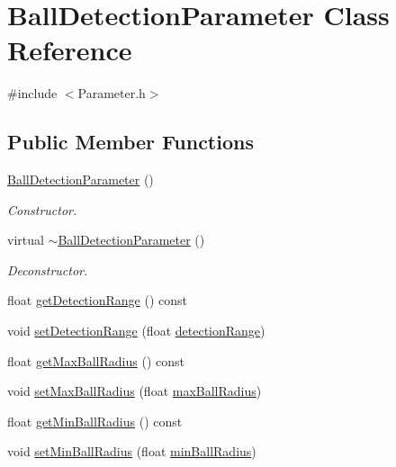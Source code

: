 \hypertarget{classBallDetectionParameter}{\section{\-Ball\-Detection\-Parameter \-Class \-Reference}
\label{classBallDetectionParameter}
}


{\ttfamily \#include $<$\-Parameter.\-h$>$}

\subsection*{\-Public \-Member \-Functions}
\begin{DoxyCompactItemize}
\item 
\hypertarget{classBallDetectionParameter_aacbacfe77b57c5472ff94983866213d8}{\hyperlink{classBallDetectionParameter_aacbacfe77b57c5472ff94983866213d8}{\-Ball\-Detection\-Parameter} ()}\label{classBallDetectionParameter_aacbacfe77b57c5472ff94983866213d8}

\begin{DoxyCompactList}\small\item\em \-Constructor. \end{DoxyCompactList}\item 
\hypertarget{classBallDetectionParameter_a451b9461f938a5446237381e5809bfb6}{virtual \hyperlink{classBallDetectionParameter_a451b9461f938a5446237381e5809bfb6}{$\sim$\-Ball\-Detection\-Parameter} ()}\label{classBallDetectionParameter_a451b9461f938a5446237381e5809bfb6}

\begin{DoxyCompactList}\small\item\em \-Deconstructor. \end{DoxyCompactList}\item 
float \hyperlink{classBallDetectionParameter_ae5fb7a62883509b5a08b5e4b317ab230}{get\-Detection\-Range} () const 
\item 
void \hyperlink{classBallDetectionParameter_a0973c5ea93d8fb3d0ab5013dd9111d6f}{set\-Detection\-Range} (float \hyperlink{classBallDetectionParameter_aca08f6d290a7fcda5359f126cf2e3065}{detection\-Range})
\item 
float \hyperlink{classBallDetectionParameter_a7b8db2d13e3e4c0aec85923e6a1812e2}{get\-Max\-Ball\-Radius} () const 
\item 
void \hyperlink{classBallDetectionParameter_ac710c9a6f55d4ccf347bf3fdfe01d70f}{set\-Max\-Ball\-Radius} (float \hyperlink{classBallDetectionParameter_a8ff493cc4b2a016ca7cd70f751d2aeb1}{max\-Ball\-Radius})
\item 
float \hyperlink{classBallDetectionParameter_aaab80da144a198d01db83ccebb5fffe8}{get\-Min\-Ball\-Radius} () const 
\item 
void \hyperlink{classBallDetectionParameter_ab45b8f54effdaf0e72b6ef6453245b45}{set\-Min\-Ball\-Radius} (float \hyperlink{classBallDetectionParameter_a258498986da34f843c173ad9bb2404da}{min\-Ball\-Radius})
\end{DoxyCompactItemize}
